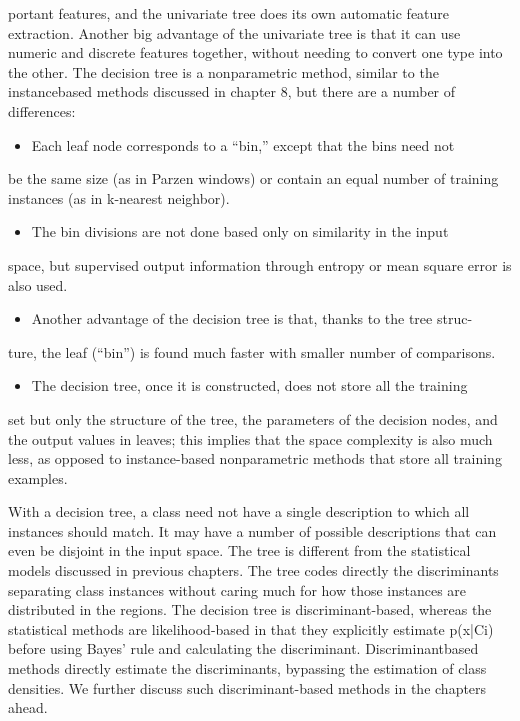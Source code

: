 portant features, and the univariate tree does its own automatic feature extraction. Another big advantage of the univariate tree is that it can use numeric and discrete features together, without needing to convert one type into the other. The decision tree is a nonparametric method, similar to the instancebased methods discussed in chapter 8, but there are a number of differences:

\begin{itemize}
\item Each leaf node corresponds to a “bin,” except that the bins need not
\end{itemize}

be the same size (as in Parzen windows) or contain an equal number of training instances (as in k-nearest neighbor).

\begin{itemize}
\item The bin divisions are not done based only on similarity in the input
\end{itemize}

space, but supervised output information through entropy or mean square error is also used.

\begin{itemize}
\item Another advantage of the decision tree is that, thanks to the tree struc-
\end{itemize}

ture, the leaf (“bin”) is found much faster with smaller number of comparisons.

\begin{itemize}
\item The decision tree, once it is constructed, does not store all the training
\end{itemize}

set but only the structure of the tree, the parameters of the decision nodes, and the output values in leaves; this implies that the space complexity is also much less, as opposed to instance-based nonparametric methods that store all training examples.

With a decision tree, a class need not have a single description to which all instances should match. It may have a number of possible descriptions that can even be disjoint in the input space. The tree is different from the statistical models discussed in previous chapters. The tree codes directly the discriminants separating class instances without caring much for how those instances are distributed in the regions. The decision tree is discriminant-based, whereas the statistical methods are likelihood-based in that they explicitly estimate p(x|Ci) before using Bayes’ rule and calculating the discriminant. Discriminantbased methods directly estimate the discriminants, bypassing the estimation of class densities. We further discuss such discriminant-based methods in the chapters ahead.

